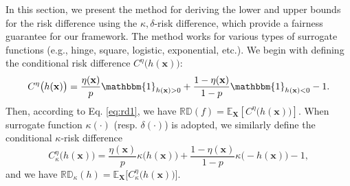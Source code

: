 \documentclass[letterpaper]{article} %
\newcommand{\X}{\mathbf{X}}
\newcommand{\x}{\mathbf{x}}
\newcommand{\E}{\mathbb{E}}
\newcommand{\I}{\mathbbm{1}}
\newcommand{\RD}{\mathbb{RD}}
\newcommand{\crd}{C^{\eta}}
\begin{document}
In this section, we present the method for deriving the lower and upper bounds for the risk difference using the $\kappa,\delta$-risk difference, which provide a fairness guarantee for our framework. The method works for various types of surrogate functions (e.g., hinge, square, logistic, exponential, etc.). We begin with defining the conditional risk difference $\crd \big( h(\x) \big)$:
\[ \crd \big( h(\x) \big) = \frac{\eta(\x)}{p} \I_{h(\x)>0} + \frac{1-\eta(\x)}{1-p} \I_{h(\x)<0} - 1. \]
Then, according to Eq. \eqref{eq:rd1}, we have $\RD(f) = \E_{\X} [ \crd \big( h(\x) \big) ]$. When surrogate function $\kappa(\cdot)$ (resp. $\delta(\cdot)$) is adopted, we similarly define the conditional $\kappa$-risk difference %
\begin{equation*}
\crd_{\kappa} \big( h(\x) \big) = \frac{\eta (\x)}{p} \kappa \big( h( \x ) \big)  + \frac{1 - \eta (\x)}{1-p} \kappa \big( - h( \x ) \big) - 1,
\end{equation*}
and we have $\RD_{\kappa} (h) = \E_\X \big[\crd_{\kappa} \big( h(\x) \big) \big]$.
\end{document}
